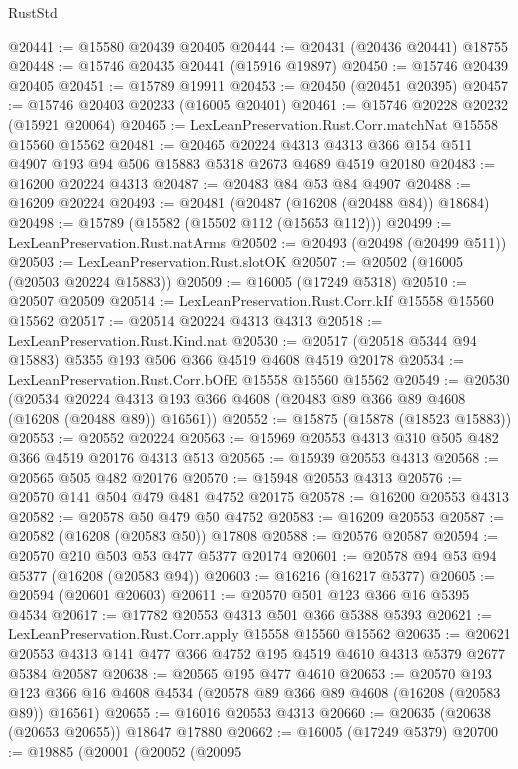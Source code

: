 \begin{lexlean}{RustStd}
\begin{coremodule}
@20441 := @15580 @20439 @20405
@20444 := @20431 (@20436 @20441) @18755
@20448 := @15746 @20435 @20441 (@15916 @19897)
@20450 := @15746 @20439 @20405
@20451 := @15789 @19911
@20453 := @20450 (@20451 @20395)
@20457 := @15746 @20403 @20233 (@16005 @20401)
@20461 := @15746 @20228 @20232 (@15921 @20064)
@20465 := LexLeanPreservation.Rust.Corr.matchNat @15558 @15560 @15562
@20481 := @20465
    @20224
    @4313
    @4313
    @366
    @154
    @511
    @4907
    @193
    @94
    @506
    @15883
    @5318
    @2673
    @4689
    @4519
    @20180
@20483 := @16200 @20224 @4313
@20487 := @20483 @84 @53 @84 @4907
@20488 := @16209 @20224
@20493 := @20481 (@20487 (@16208 (@20488 @84)) @18684)
@20498 := @15789 (@15582 (@15502 @112 (@15653 @112)))
@20499 := LexLeanPreservation.Rust.natArms
@20502 := @20493 (@20498 (@20499 @511))
@20503 := LexLeanPreservation.Rust.slotOK
@20507 := @20502 (@16005 (@20503 @20224 @15883))
@20509 := @16005 (@17249 @5318)
@20510 := @20507 @20509
@20514 := LexLeanPreservation.Rust.Corr.kIf @15558 @15560 @15562
@20517 := @20514 @20224 @4313 @4313
@20518 := LexLeanPreservation.Rust.Kind.nat
@20530 := @20517 (@20518 @5344 @94 @15883) @5355 @193 @506 @366 @4519 @4608 @4519 @20178
@20534 := LexLeanPreservation.Rust.Corr.bOfE @15558 @15560 @15562
@20549 := @20530
    (@20534 @20224 @4313 @193 @366 @4608 (@20483 @89 @366 @89 @4608 (@16208 (@20488 @89)) @16561))
@20552 := @15875 (@15878 (@18523 @15883))
@20553 := @20552 @20224
@20563 := @15969 @20553 @4313 @310 @505 @482 @366 @4519 @20176 @4313 @513
@20565 := @15939 @20553 @4313
@20568 := @20565 @505 @482 @20176
@20570 := @15948 @20553 @4313
@20576 := @20570 @141 @504 @479 @481 @4752 @20175
@20578 := @16200 @20553 @4313
@20582 := @20578 @50 @479 @50 @4752
@20583 := @16209 @20553
@20587 := @20582 (@16208 (@20583 @50)) @17808
@20588 := @20576 @20587
@20594 := @20570 @210 @503 @53 @477 @5377 @20174
@20601 := @20578 @94 @53 @94 @5377 (@16208 (@20583 @94))
@20603 := @16216 (@16217 @5377)
@20605 := @20594 (@20601 @20603)
@20611 := @20570 @501 @123 @366 @16 @5395 @4534
@20617 := @17782 @20553 @4313 @501 @366 @5388 @5393
@20621 := LexLeanPreservation.Rust.Corr.apply @15558 @15560 @15562
@20635 := @20621 @20553 @4313 @141 @477 @366 @4752 @195 @4519 @4610 @4313 @5379 @2677 @5384 @20587
@20638 := @20565 @195 @477 @4610
@20653 := @20570
    @193
    @123
    @366
    @16
    @4608
    @4534
    (@20578 @89 @366 @89 @4608 (@16208 (@20583 @89)) @16561)
@20655 := @16016 @20553 @4313
@20660 := @20635 (@20638 (@20653 @20655)) @18647 @17880
@20662 := @16005 (@17249 @5379)
@20700 := @19885
    (@20001
      (@20052
        (@20095

\end{coremodule}
\end{lexlean}
